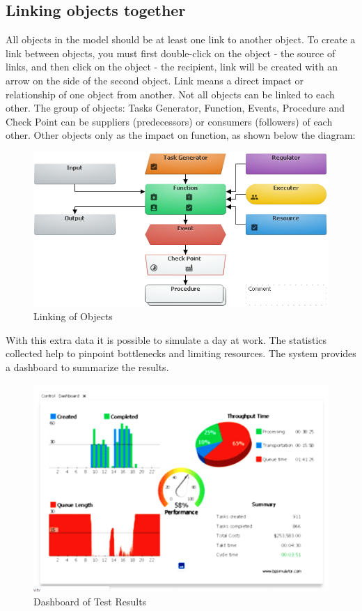 \documentclass[]{book}
\begin{document}
\hypertarget{linking-objects-together}{%
\subsection{Linking objects together}\label{linking-objects-together}}

All objects in the model should be at least one link to another object. To create a link between objects, you must first double-click on the object - the source of links, and then click on the object - the recipient, link will be created with an arrow on the side of the second object. Link means a direct impact or relationship of one object from another. Not all objects can be linked to each other. The group of objects: Tasks Generator, Function, Events, Procedure and Check Point can be suppliers (predecessors) or consumers (followers) of each other. Other objects only as the impact on function, as shown below the diagram:

\begin{figure}
\centering
\includegraphics{images/exmodeling5.png}
\caption{Linking of Objects}
\end{figure}

With this extra data it is possible to simulate a day at work. The statistics collected help to pinpoint bottlenecks and limiting resources. The system provides a dashboard to summarize the results.

\begin{figure}
\centering
\includegraphics{images/bpsim2.png}
\caption{Dashboard of Test Results}
\end{figure}
\end{document}
